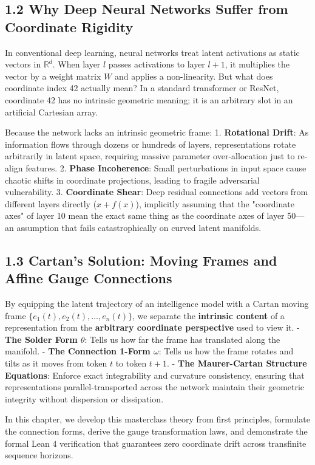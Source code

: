 \documentclass[11pt,twoside,openright]{amsbook}
\begin{document}
{{{{{{\subsection{1.2 Why Deep Neural Networks Suffer from Coordinate Rigidity}
In conventional deep learning, neural networks treat latent activations as static vectors in $\mathbb{R}^d$. When layer $l$ passes activations to layer $l+1$, it multiplies the vector by a weight matrix $W$ and applies a non-linearity. But what does coordinate index 42 actually mean? In a standard transformer or ResNet, coordinate 42 has no intrinsic geometric meaning; it is an arbitrary slot in an artificial Cartesian array.

Because the network lacks an intrinsic geometric frame:
1. \textbf{Rotational Drift}: As information flows through dozens or hundreds of layers, representations rotate arbitrarily in latent space, requiring massive parameter over-allocation just to re-align features.
2. \textbf{Phase Incoherence}: Small perturbations in input space cause chaotic shifts in coordinate projections, leading to fragile adversarial vulnerability.
3. \textbf{Coordinate Shear}: Deep residual connections add vectors from different layers directly ($x + f(x)$), implicitly assuming that the "coordinate axes" of layer 10 mean the exact same thing as the coordinate axes of layer 50—an assumption that fails catastrophically on curved latent manifolds.

\subsection{1.3 Cartan's Solution: Moving Frames and Affine Gauge Connections}
By equipping the latent trajectory of an intelligence model with a Cartan moving frame $\{e_1(t), e_2(t), \dots, e_n(t)\}$, we separate the \textbf{intrinsic content} of a representation from the \textbf{arbitrary coordinate perspective} used to view it.
- \textbf{The Solder Form $\theta$}: Tells us how far the frame has translated along the manifold.
- \textbf{The Connection 1-Form $\omega$}: Tells us how the frame rotates and tilts as it moves from token $t$ to token $t+1$.
- \textbf{The Maurer-Cartan Structure Equations}: Enforce exact integrability and curvature consistency, ensuring that representations parallel-transported across the network maintain their geometric integrity without dispersion or dissipation.

In this chapter, we develop this masterclass theory from first principles, formulate the connection forms, derive the gauge transformation laws, and demonstrate the formal Lean 4 verification that guarantees zero coordinate drift across transfinite sequence horizons.

}}}}}}
\end{document}
